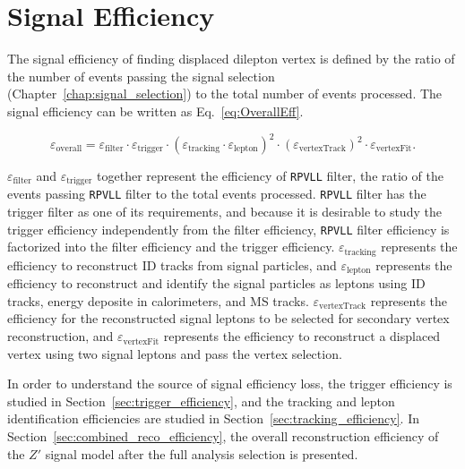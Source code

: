 \chapter{Signal Efficiency}
\label{chap:eff}

The signal efficiency of finding displaced dilepton vertex is defined by the ratio of the number of events passing the signal selection (Chapter~\ref{chap:signal_selection}) to the total number of events processed. The signal efficiency can be written as Eq.~\ref{eq:OverallEff}. 

\begin{equation}
\label{eq:OverallEff}
\varepsilon_{\mathrm{overall}} = \varepsilon_{\mathrm{filter}} \cdot \varepsilon_{\mathrm{trigger}} \cdot 
                     (\varepsilon_{\mathrm{tracking}} \cdot \varepsilon_{\mathrm{lepton}})^2 \cdot
                     (\varepsilon_{\mathrm{vertexTrack}})^2 \cdot
                     \varepsilon_{\mathrm{vertexFit}}.
\end{equation}

$\varepsilon_{\mathrm{filter}}$ and $\varepsilon_{\mathrm{trigger}}$ together represent the efficiency of \texttt{RPVLL} filter, the ratio of the events passing \texttt{RPVLL} filter to the total events processed. \texttt{RPVLL} filter has the trigger filter as one of its requirements, and because it is desirable to study the trigger efficiency independently from the filter efficiency, \texttt{RPVLL} filter efficiency is factorized into the filter efficiency and the trigger efficiency. $\varepsilon_{\mathrm{tracking}}$ represents the efficiency to reconstruct ID tracks from signal particles, and $\varepsilon_{\mathrm{lepton}}$ represents the efficiency to reconstruct and identify the signal particles as leptons using ID tracks, energy deposite in calorimeters, and MS tracks. $\varepsilon_{\mathrm{vertexTrack}}$ represents the efficiency for the reconstructed signal leptons to be selected for secondary vertex reconstruction, and $\varepsilon_{\mathrm{vertexFit}}$ represents the efficiency to reconstruct a displaced vertex using two signal leptons and pass the vertex selection.

In order to understand the source of signal efficiency loss, the trigger efficiency is studied in Section~\ref{sec:trigger_efficiency}, and the tracking and lepton identification efficiencies are studied in Section~\ref{sec:tracking_efficiency}. In Section~\ref{sec:combined_reco_efficiency}, the overall reconstruction efficiency of the $Z'$ signal model after the full analysis selection is presented. 

